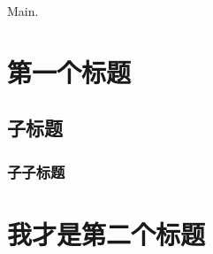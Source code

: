 \documentclass{article}
\begin{document}
Main.

\section{第一个标题}

\subsection{子标题}

\subsubsection{子子标题}

\section{我才是第二个标题}
\end{document}
